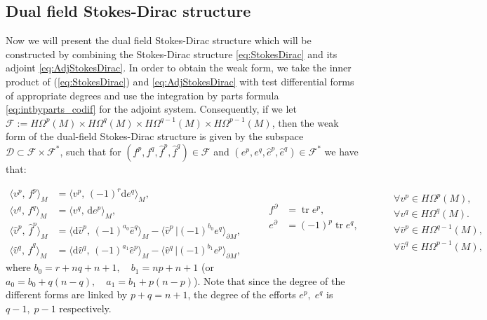 \documentclass{elsarticle}
\renewcommand\d{\ensuremath{\mathrm{d}}}
\DeclareMathOperator{\tr}{tr}
\newcommand*{\dual}[1]{\ensuremath{\widehat{#1}}}
\newcommand{\inpr}[3][]{\ensuremath{\langle #2, \, #3 \rangle_{#1}}}
\newcommand{\dualpr}[3][]{\ensuremath{\langle #2 \, \vert #3 \rangle_{#1}}}
\begin{document}
\subsection{Dual field Stokes-Dirac structure}
Now we will present the dual field Stokes-Dirac structure which will be constructed by combining the Stokes-Dirac structure \eqref{eq:StokesDirac} and its adjoint \eqref{eq:AdjStokesDirac}. In order to obtain the weak form, we take the inner product of (\eqref{eq:StokesDirac}) and \eqref{eq:AdjStokesDirac} with test differential forms of appropriate degrees and use the integration by parts formula \eqref{eq:intbyparts_codif} for the adjoint system. Consequently, if we let $\mathcal{F}:= H\Omega^p(M)\times H\Omega^q(M) \times H\Omega^{q-1}(M) \times H\Omega^{p-1}(M)$, then the weak form of the dual-field Stokes-Dirac structure is given by the subspace $\mathcal{D} \subset \mathcal{F}\times \mathcal{F}^*$, such that for $(f^p,f^q,\dual{f}^p,\dual{f}^q)\in \mathcal{F}$ and $(e^p,e^q,\dual{e}^p,\dual{e}^q)\in \mathcal{F}^*$ we have that:

 \begin{equation}\label{eq:weak_dfSDS}
    \begin{aligned}
    \inpr[M]{v^p}{f^p} &= \inpr[M]{v^p}{(-1)^r\d e^q}, \\
    \inpr[M]{v^q}{f^q} &= \inpr[M]{v^q}{\d e^p}, \\
    \inpr[M]{\dual{v}^p}{\dual{f}^p} &= \inpr[M]{\d\dual{v}^p}{(-1)^{a_0} \dual{e}^q} - \dualpr[\partial M]{\dual{v}^p}{(-1)^{b_0} e^q}, \\
      \inpr[M]{\dual{v}^q}{\dual{f}^q} &= \inpr[M]{\d\dual{v}^q}{(-1)^{a_1}
      \dual{e}^p} - \dualpr[\partial M]{\dual{v}^q}{(-1)^{b_1} e^p},
    \end{aligned} \qquad
    \begin{aligned}
    f^\partial &= \tr e^p, \\
    e^\partial &=(-1)^p\tr e^q, \\
    \\
    \\
    \end{aligned} \qquad
    \begin{aligned}
    &\forall v^p \in H\Omega^p(M), \\
    &\forall v^q \in H\Omega^q(M). \\
    &\forall\dual{v}^p \in H\Omega^{q-1}(M), \\
    &\forall\dual{v}^q \in H\Omega^{p-1}(M),
    \end{aligned}
\end{equation}
where $ b_0 = r + nq + n + 1, \quad b_1 = np + n +1$ (or $a_0 = b_0 + q(n-q), \quad a_1 = b_1 + p(n-p)$).  Note that since the degree of the different forms are linked by $p+q = n+1$, the degree of the efforts $e^p, \; e^q$ is $q-1, \; p-1$ respectively.
\end{document}

